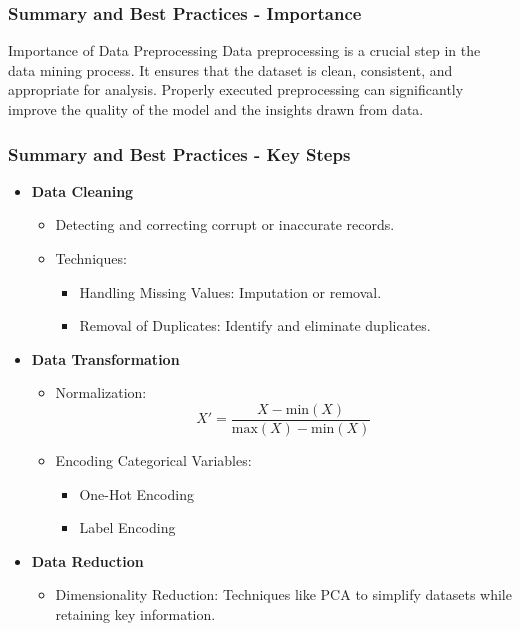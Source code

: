 \documentclass[aspectratio=169]{beamer}
\begin{document}
\begin{frame}[fragile]
    \frametitle{Summary and Best Practices - Importance}
    \begin{block}{Importance of Data Preprocessing}
        Data preprocessing is a crucial step in the data mining process. 
        It ensures that the dataset is clean, consistent, and appropriate for analysis. 
        Properly executed preprocessing can significantly improve the quality of the model and the insights drawn from data.
    \end{block}
\end{frame}

\begin{frame}[fragile]
    \frametitle{Summary and Best Practices - Key Steps}
    \begin{itemize}
        \item \textbf{Data Cleaning}
            \begin{itemize}
                \item Detecting and correcting corrupt or inaccurate records.
                \item Techniques:
                    \begin{itemize}
                        \item Handling Missing Values: Imputation or removal.
                        \item Removal of Duplicates: Identify and eliminate duplicates.
                    \end{itemize}
            \end{itemize}
        \item \textbf{Data Transformation}
            \begin{itemize}
                \item Normalization: 
                \begin{equation}
                    X' = \frac{X - \text{min}(X)}{\text{max}(X) - \text{min}(X)}
                \end{equation}
                \item Encoding Categorical Variables:
                    \begin{itemize}
                        \item One-Hot Encoding
                        \item Label Encoding
                    \end{itemize}
            \end{itemize}
        \item \textbf{Data Reduction}
            \begin{itemize}
                \item Dimensionality Reduction: Techniques like PCA to simplify datasets while retaining key information.
            \end{itemize}
    \end{itemize}
\end{frame}
\end{document}
